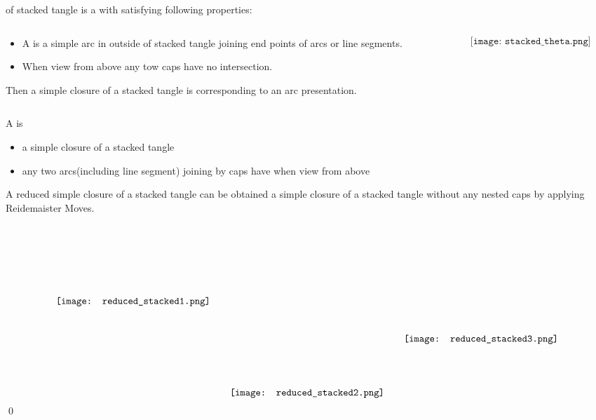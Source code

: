 \begin{frame}
	 of stacked tangle is a  with  satisfying following properties:
	\vspace*{-10pt}
	\begin{columns}
		\begin{column}{.8\textwidth}
			\begin{itemize}
				\item A  is a simple arc in outside of stacked tangle joining end points of arcs or line segments.
				\item When view from above any tow caps have no intersection.
			\end{itemize}					
			Then a simple closure of a stacked tangle  is corresponding to an arc presentation.
		\end{column}

	\begin{column}{.2\textwidth}
		$$\texttt{[image: stacked\_theta.png]}$$
	\end{column}
	\end{columns}
	A  is 
	\begin{itemize}
		\item a simple closure of a stacked tangle 
		\item any two arcs(including line segment) joining by caps have  when view from above
	\end{itemize}
\end{frame}


\begin{frame}
	\begin{prop}
		A reduced simple closure of a stacked tangle
		can be obtained a simple closure of a stacked tangle without any nested caps by applying Reidemaister Moves.
	\end{prop}
	\mypf
	\vspace*{-12pt}
	$$\raisebox{-.13\textheight}{\texttt{[image: reduced\_stacked1.png]}}\qquad\raisebox{-.3\textheight}{\texttt{[image: reduced\_stacked2.png]}}\qquad\raisebox{-.2\textheight}{\texttt{[image: reduced\_stacked3.png]}}$$
	\hfill\qed
\end{frame}


